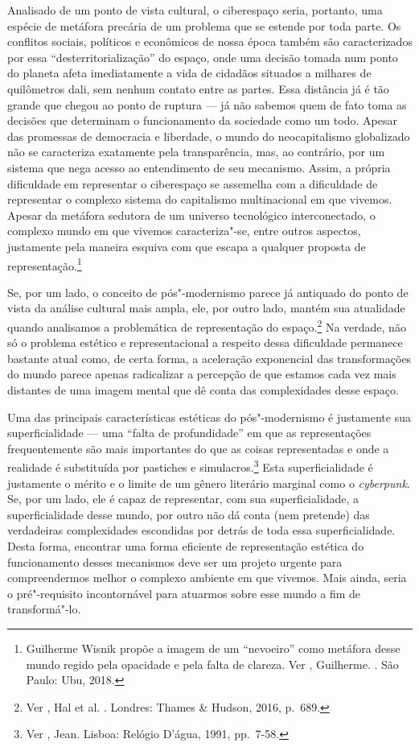 Analisado de um ponto de vista cultural, o ciberespaço seria, portanto, uma
espécie de metáfora precária de um problema que se estende por toda
parte. Os conflitos sociais, políticos e econômicos de nossa época
também são caracterizados por essa ``desterritorialização'' do espaço,
onde uma decisão tomada num ponto do planeta afeta imediatamente a vida
de cidadãos situados a milhares de quilômetros dali, sem nenhum contato
entre as partes. Essa distância já é tão grande que chegou ao ponto de
ruptura --- já não sabemos quem de fato toma as decisões que determinam o
funcionamento da sociedade como um todo. Apesar das promessas de
democracia e liberdade, o mundo do neocapitalismo globalizado não se
caracteriza exatamente pela transparência, mas, ao contrário, por um
sistema que nega acesso ao entendimento de seu mecanismo. Assim, a
própria dificuldade em representar o ciberespaço se assemelha com a
dificuldade de representar o complexo sistema do capitalismo
multinacional em que vivemos. Apesar da metáfora sedutora de um universo
tecnológico interconectado, o complexo mundo em que vivemos
caracteriza"-se, entre outros aspectos, justamente pela maneira esquiva
com que escapa a qualquer proposta de representação.\footnote{Guilherme
  Wisnik propõe a imagem de um ``nevoeiro'' como metáfora desse mundo
  regido pela opacidade e pela falta de clareza. Ver , Guilherme.
  {}. São
  Paulo: Ubu, 2018.}

Se, por um lado, o conceito de pós"-modernismo parece já antiquado do
ponto de vista da análise cultural mais ampla, ele, por outro lado,
mantém sua atualidade quando analisamos a problemática de representação
do espaço.\footnote{Ver , Hal et al. {}. Londres: Thames \& Hudson,
  2016, p.~689.} Na verdade, não só o problema estético e
representacional a respeito dessa dificuldade permanece bastante atual
como, de certa forma, a aceleração exponencial das transformações do
mundo parece apenas radicalizar a percepção de que estamos cada vez mais
distantes de uma imagem mental que dê conta das complexidades desse
espaço.

Uma das principais características estéticas do pós"-modernismo é
justamente sua superficialidade --- uma ``falta de profundidade'' em que as
representações frequentemente são mais importantes do que as coisas
representadas e onde a realidade é substituída por pastiches e
simulacros.\footnote{Ver , Jean. {} Lisboa: Relógio D'água, 1991, pp.~7-58.} Esta
superficialidade é justamente o mérito e o limite de um gênero literário
marginal como o \emph{cyberpunk}. Se, por um lado, ele é capaz de
representar, com sua superficialidade, a superficialidade desse mundo,
por outro não dá conta (nem pretende) das verdadeiras complexidades
escondidas por detrás de toda essa superficialidade. Desta forma,
encontrar uma forma eficiente de representação estética do funcionamento
desses mecanismos deve ser um projeto urgente para compreendermos melhor
o complexo ambiente em que vivemos. Mais ainda, seria o pré"-requisito
incontornável para atuarmos sobre esse mundo a fim de transformá"-lo.

